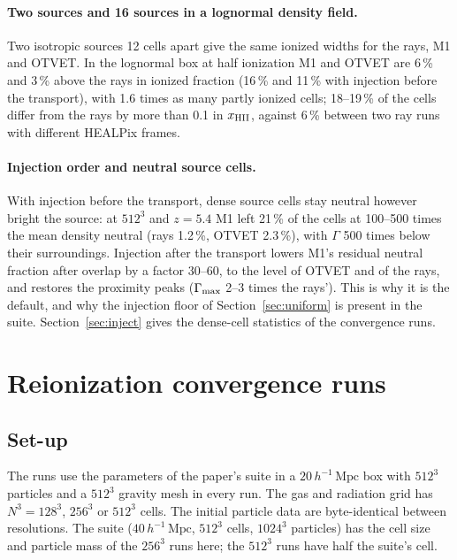 \documentclass[11pt]{article}
\newcommand{\mpch}{\,h^{-1}\,\mathrm{Mpc}}
\begin{document}
\paragraph{Two sources and 16 sources in a lognormal density field.} Two isotropic sources 12 cells apart give
the same ionized widths for the rays, M1 and OTVET. In the lognormal box at half ionization M1 and OTVET are
6\,\% and 3\,\% above the rays in ionized fraction (16\,\% and 11\,\% with injection before the transport), with
1.6 times as many partly ionized cells; 18--19\,\% of the cells differ from the rays by more than 0.1 in
$x_{\rm HII}$, against 6\,\% between two ray runs with different HEALPix frames.

\paragraph{Injection order and neutral source cells.} With injection before the transport, dense source cells stay
neutral however bright the source: at $512^3$ and $z=5.4$ M1 left 21\,\% of the cells at 100--500 times the mean
density neutral (rays 1.2\,\%, OTVET 2.3\,\%), with $\Gamma$ 500 times below their surroundings. Injection after
the transport lowers M1's residual neutral fraction after overlap by a factor 30--60, to the level of OTVET and of the rays,
and restores the proximity peaks ($\Gamma_{\rm max}$ 2--3 times the rays'). This is why it is the default, and why
the injection floor of Section~\ref{sec:uniform} is present in the suite. Section~\ref{sec:inject} gives the
dense-cell statistics of the convergence runs.

\section{Reionization convergence runs}\label{sec:reion}

\subsection{Set-up}

The runs use the parameters of the paper's suite in a $20\mpch$ box with $512^3$ particles and a $512^3$ gravity mesh in every
run. The gas and radiation grid has $N^3=128^3$, $256^3$ or $512^3$ cells. The initial particle
data are byte-identical between resolutions. The suite ($40\mpch$, $512^3$ cells, $1024^3$ particles) has the cell
size and particle mass of the $256^3$ runs here; the $512^3$ runs have half the suite's cell.
\end{document}
